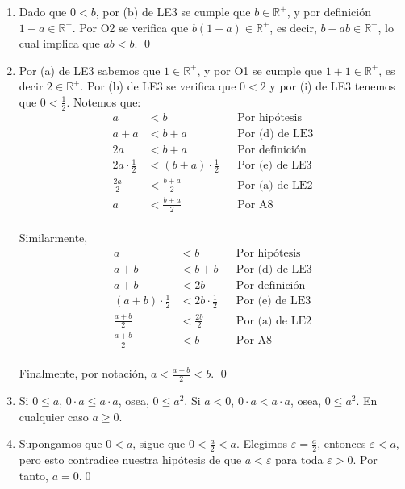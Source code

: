 \documentclass[11pt]{article}
\begin{document}
\begin{enumerate}[label=\alph*),font=\bfseries]

    \item Dado que $0<b$, por (b) de LE3 se cumple que $b \in \mathbb{R}^+$, y por definición $1-a \in \mathbb{R}^+$. Por O2 se verifica que $b(1-a) \in \mathbb{R}^+$, es decir, $b-ab \in \mathbb{R}^+$, lo cual implica que $ab<b$. \qed


    \item Por (a) de LE3 sabemos que $1 \in \mathbb{R}^+$, y por O1 se cumple que $1+1 \in \mathbb{R}^+$, es decir $2 \in \mathbb{R}^+$. Por (b) de LE3 se verifica que $0<2$ y por (i) de LE3 tenemos que $0<\frac{1}{2}$. Notemos que: \begin{align*}
        a &< b && \text{Por hipótesis} \\
        a + a &< b+a && \text{Por (d) de LE3} \\
        2a &< b+a && \text{Por definición} \\
        2a \cdot \frac{1}{2} &< (b+a) \cdot \frac{1}{2} && \text{Por (e) de LE3} \\
        \frac{2a}{2} &< \frac{b+a}{2} && \text{Por (a) de LE2} \\
        a &< \frac{b+a}{2} && \text{Por A8}
    \end{align*} \\ Similarmente,
    \begin{align*}
        a &< b && \text{Por hipótesis} \\
        a + b &< b+b && \text{Por (d) de LE3} \\
        a +b &< 2b && \text{Por definición} \\
        (a+b) \cdot \frac{1}{2} &< 2b \cdot \frac{1}{2} && \text{Por (e) de LE3} \\
        \frac{a+b}{2} &< \frac{2b}{2} && \text{Por (a) de LE2} \\
        \frac{a+b}{2} &< b && \text{Por A8}
    \end{align*}\\ Finalmente, por notación, $a < \frac{a+b}{2} < b$. \qed


    \item Si $0 \leq a$, $ 0\cdot a \leq a \cdot a$, osea, $0 \leq a^2$. Si $a<0$, $0\cdot a < a \cdot a$, osea, $0 \leq a^2$. En cualquier caso $a\geq0$.

    \item Supongamos que $0<a$, sigue que $0<\frac{a}{2}<a$. Elegimos $\varepsilon=\frac{a}{2}$, entonces $\varepsilon<a$, pero esto contradice nuestra hipótesis de que $a< \varepsilon$ para toda $\varepsilon>0$. Por tanto, $a=0$.\qed


\end{enumerate}
\end{document}
